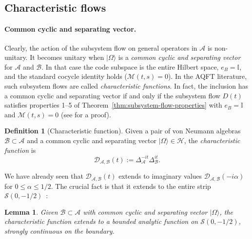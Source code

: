 \documentclass[a4paper,11pt]{article}
\newtheorem{lemma}[theorem]{Lemma}
\theoremstyle{definition}
\newtheorem{definition}{Definition}[section]
\theoremstyle{remark}
\newcommand{\id}{\mathbb{I}}
\newcommand{\mA}{\mathcal{A}}
\newcommand{\mB}{\mathcal{B}}
\newcommand{\mM}{\mathcal{M}}
\begin{document}
\subsection{Characteristic flows}
\label{subsec:char-flows}
 
\paragraph{Common cyclic and separating vector.}
Clearly, the action of the subsystem flow on general operators in $\mA$ is non-unitary.
It becomes unitary when $|\Omega\rangle$ is a \emph{common cyclic and separating
vector} for $\mA$ and $\mB$.  In that case the code subspace is the entire Hilbert
space, $e_B=\id$, and the standard cocycle identity holds ($\mM(t,s)=0$).  In the
AQFT literature, such subsystem flows are called \emph{characteristic functions}.  In
fact, the inclusion has a common cyclic and separating vector if and only if the
subsystem flow $D(t)$ satisfies properties 1--5 of Theorem~\ref{thm:subsystem-flow-properties}
with $e_B=\id$ and $\mM(t,s)=0$ (see \cite{} for a proof).
 
\begin{definition}[Characteristic function]\label{def:char-fn}
Given a pair of von Neumann algebras $\mathcal{B}\subset\mathcal{A}$ and a common
cyclic and separating vector $|\Omega\rangle\in\mathcal{H}$, the
\emph{characteristic function} is
\begin{equation}
    \mathcal{D}_{\mathcal{A}, \mathcal{B}}(t) := \Delta_\mathcal{A}^{-it}\Delta_\mathcal{B}^{it}.
\end{equation}
\end{definition}
 
We have already seen that $\mathcal{D}_{\mathcal{A}, \mathcal{B}}(t)$ extends to
imaginary values $\mathcal{D}_{\mathcal{A}, \mathcal{B}}(-i\alpha)$ for
$0\leq \alpha\leq 1/2$.  The crucial fact is that it extends to the entire strip
$\mathcal{S}(0, -1/2)$~\cite{revolutionizing}:
 
\begin{lemma}\label{lem:char-fn-analytic}
Given $\mathcal{B}\subset\mathcal{A}$ with common cyclic and separating vector
$|\Omega\rangle$, the characteristic function extends to a bounded analytic function on
$\mathcal{S}(0,-1/2)$, strongly continuous on the boundary.
\end{lemma}
 
\end{document}
